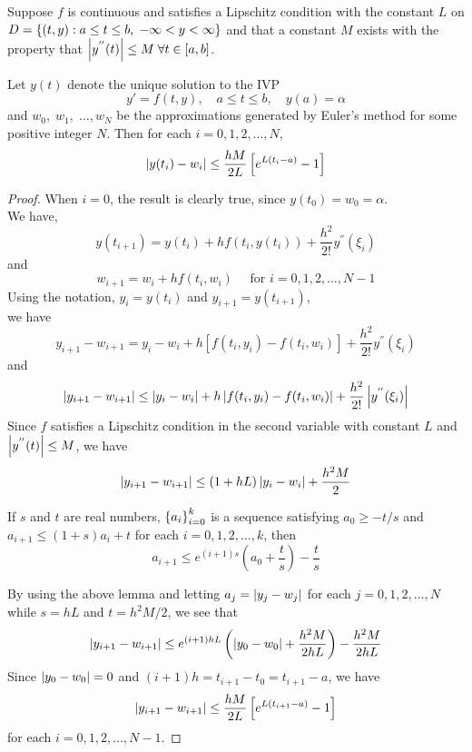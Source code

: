 \documentclass[../main-sheet.tex]{subfiles}
\begin{document}
\begin{thm}
    \label{thm:3}
    Suppose \(f\) is continuous and satisfies a Lipschitz condition with the constant \(L\) on \(D=\left\{(t,y):a\leq t\leq b,\;-\infty<y<\infty\right\}\) and that a constant \(M \) exists with the property that \(\left\vert y^{''}(t)\right\vert\leq M\;\forall t\in [a,b]\).

    Let \(y(t)\) denote the unique solution to the IVP 
    \[
        y'=f(t,y),\quad a\leq t\leq b,\quad y(a)=\alpha
    \]
    and \(w_0,\;w_1,\;\dots, w_N\) be the approximations generated by Euler's method for some positive integer \(N\).
    Then for each \(i=0,1,2,\dots,N\),
    \begin{equation}
        \left\vert y(t_i)-w_i\right\vert\leq \frac{h M}{2L}\left[ e^{L(t_i-a)} -1\right]
        \label{eq:thm3.1}
    \end{equation}
\end{thm}
\begin{proof}
    When \(i=0\), the result is clearly true, since \(y(t_0)=w_0=\alpha\).\\
    We have,
    \begin{equation}
        y(t_{i+1})=y(t_i)+h f(t_i,y(t_i))+\frac{h^2}{2!}y^{''}(\xi_i)
        \label{eq:thm3.2}
    \end{equation}
    and 
    \begin{equation}
        w_{i+1}=w_i+h f(t_i,w_i)\quad\text{ for } i=0,1,2,\dots,N-1
        \label{eq:thm3.3}
    \end{equation}
    Using the notation, \(y_i=y(t_i)\) and \(y_{i+1}=y(t_{i+1})\),\\
    we have
    \[
        y_{i+1}-w_{i+1}=y_i-w_i+h\left[ f(t_i,y_i)-f(t_i,w_i)\right]+\frac{h^2}{2!}y^{''}(\xi_i)
        \]
        and
        \begin{equation}
            \left\vert y_{i+1}-w_{i+1}\right\vert\leq \left\vert y_i-w_i\right\vert+h\left\vert f(t_i,y_i)-f(t_i,w_i)\right\vert+\frac{h^2}{2!}\left\vert y^{''}(\xi_i)\right\vert\label{eq:thm3.4}
        \end{equation}
        Since \(f\) satisfies a Lipschitz condition in the second variable with constant \(L\) and \(\left\vert y^{''}(t)\right\vert\leq M\), we have
        \[
            \left\vert y_{i+1}-w_{i+1}\right\vert\leq (1+hL)\left\vert y_i-w_i\right\vert+\frac{h^2M}{2}
        \]
        \begin{lem}
            If \(s\) and \(t\) are real numbers, \(\left\{a_i\right\}_{i=0}^k\) is a sequence satisfying \(a_0\geq -t/s\) and \(a_{i+1}\leq (1+s)a_i+t\) for each \(i=0,1,2,\dots,k\), then 
            \[
                a_{i+1}\leq e^{(i+1)s}\left(a_0+\frac{t}{s}\right)-\frac{t}{s}
            \]
        \end{lem}
                
        By using the above lemma and letting \(a_j=\left\vert y_j-w_j\right\vert \) for each \(j=0,1,2,\dots,N\) while \(s=hL\) and \(t=h^2M/2\), we see that
        \[
            \left\vert y_{i+1}-w_{i+1}\right\vert\leq e^{(i+1)hL}\left( \left\vert y_0-w_0\right\vert+\frac{h^2M}{2hL} \right)-\frac{h^2M}{2hL}
        \]
        Since \(\left\vert y_0-w_0\right\vert=0\) and \((i+1)h=t_{i+1}-t_0=t_{i+1}-a\), we have
        \[
            \left\vert y_{i+1}-w_{i+1}\right\vert\leq \frac{h M}{2L}\left[ e^{L(t_{ i+1}-a)} -1\right]
        \]
        for each \(i=0,1,2,\dots, N-1\).
    \end{proof}
\end{document}
